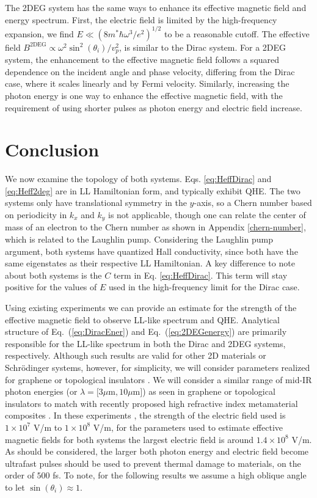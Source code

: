 \documentclass[aps,prb,twocolumn,showpacs,superscriptaddress]{revtex4-2}
\begin{document}
The 2DEG system has the same ways to enhance its effective magnetic field and energy spectrum.
First, the electric field is limited by the high-frequency expansion, we find $E \ll (8m^*\hbar\omega^3/e^2)^{1/2}$ to be a reasonable cutoff.
The effective field $B^{\text{2DEG}} \propto \omega^2 \sin^2{(\theta_i)} / v_p^2$, is similar to the Dirac system.
For a 2DEG system, the enhancement to the effective magnetic field follows a squared dependence on the incident angle and phase velocity, differing from the Dirac case, where it scales linearly and by Fermi velocity.
Similarly, increasing the photon energy is one way to enhance the effective magnetic field, with the requirement of using shorter pulses as photon energy and electric field increase.

\section{Conclusion}

We now examine the topology of both systems.
Eqs. \eqref{eq:HeffDirac} and \eqref{eq:Heff2deg} are in LL Hamiltonian form, and typically exhibit QHE.
The two systems only have translational symmetry in the $y$-axis, so a Chern number based on periodicity in $k_x$ and $k_y$ is not applicable, though one can relate the center of mass of an electron to the Chern number as shown in Appendix \ref{chern-number}, which is related to the Laughlin pump.
Considering the Laughlin pump argument, both systems have quantized Hall conductivity, since both have the same eigenstates as their respective LL Hamiltonian.
A key difference to note about both systems is the $C$ term in Eq. \eqref{eq:HeffDirac}.
This term will stay positive for the values of $E$ used in the high-frequency limit for the Dirac case.

Using existing experiments \cite{YHW, JWM} we can provide an estimate for the strength of the effective magnetic field to observe LL-like spectrum and QHE.
Analytical structure of Eq.~(\ref{eq:DiracEner}) and Eq.~(\ref{eq:2DEGenergy}) are primarily responsible for the LL-like spectrum in both the Dirac and 2DEG systems, respectively.
Although such results are valid for other 2D materials or Schr\"{o}dinger systems, however, for simplicity, we will consider parameters realized for graphene or topological insulators \cite{YHW, JWM}.
We will consider a similar range of mid-IR photon energies (or $\lambda = [3\mu $m$ , 10\mu $m$]$) as seen in graphene or topological insulators \cite{YHW, JWM} to match with recently proposed high refractive index metamaterial composites \cite{shimFundamentalLimitsRefractive2021}.
In these experiments \cite{YHW, JWM}, the strength of the electric field used is $1 \times 10^7$ V/m to $1 \times 10^8$ V/m, for the parameters used to estimate effective magnetic fields for both systems the largest electric field is around $1.4 \times 10^8$ V/m.
As should be considered, the larger both photon energy and electric field become ultrafast pulses should be used to prevent thermal damage to materials, on the order of $500$ fs.
To note, for the following results we assume a high oblique angle to let $\sin{(\theta_i)} \approx 1$.
\end{document}
